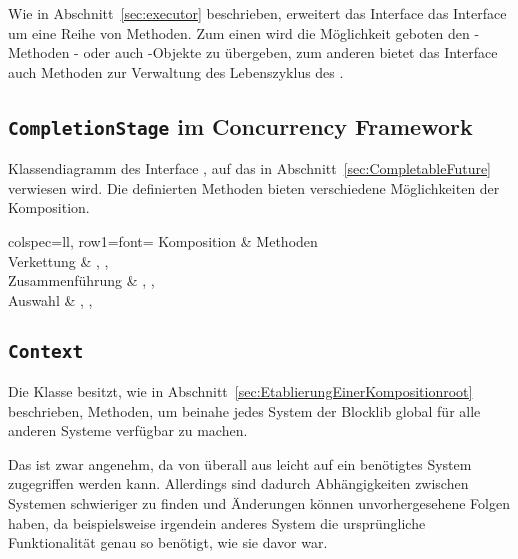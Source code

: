 Wie in Abschnitt~\vref{sec:executor} beschrieben, erweitert das Interface  das Interface  um eine Reihe von Methoden. Zum einen wird die Möglichkeit geboten den -Methoden - oder auch -Objekte zu übergeben, zum anderen bietet das Interface auch Methoden zur Verwaltung des Lebenszyklus des .

\clearpage
\subsection{\texttt{CompletionStage} im Concurrency Framework}\label{appendix:CompletionStage}


Klassendiagramm des Interface , auf das in Abschnitt~\vref{sec:CompletableFuture} verwiesen wird. Die definierten Methoden bieten verschiedene Möglichkeiten der Komposition.

\begin{tblr}{
	colspec={ll},
	row{1}={font=\bfseries}
	}
	Komposition & Methoden \\
	Verkettung & , , \\
	Zusammenführung & , ,  \\
	Auswahl & , ,  \\
\end{tblr}

\clearpage
\subsection{\texttt{Context}}\label{appendix:context}
{
	\centering
	
	\par
}
Die Klasse  besitzt, wie in Abschnitt~\vref{sec:EtablierungEinerKompositionroot} beschrieben, Methoden, um beinahe jedes System der Blocklib global für alle anderen Systeme verfügbar zu machen. 

Das ist zwar angenehm, da von überall aus leicht auf ein benötigtes System zugegriffen werden kann. Allerdings sind dadurch Abhängigkeiten zwischen Systemen schwieriger zu finden und Änderungen können unvorhergesehene Folgen haben, da beispielsweise irgendein anderes System die ursprüngliche Funktionalität genau so benötigt, wie sie davor war. 
\clearpage
